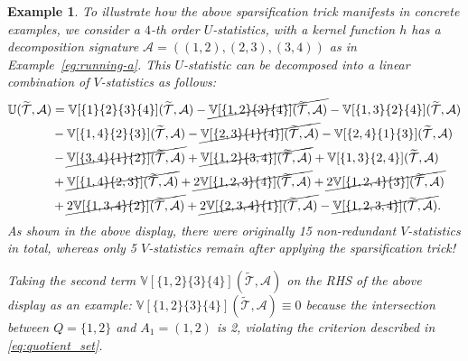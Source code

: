 \documentclass[twoside,11pt]{article}
\newtheorem{subexample}{Example}
\newcommand{\ustat}{\mathbb{U}}
\newcommand{\vstat}{\mathbb{V}}
\def\calA{\mathcal{A}}
\def\calT{\mathcal{T}}
\begin{document}
\begin{subexample}
\label{eg:sparsification}
To illustrate how the above sparsification trick manifests in concrete examples, we consider a $4$-th order $U$-statistics, with a kernel function $h$ has a decomposition signature $\calA = ((1,2),(2,3),(3,4))$ as in Example~\ref{eg:running-a}. This $U$-statistic can be decomposed into a linear combination of $V$-statistics as follows:
\begin{align*}
  \ustat(\widetilde{ \calT }, \calA) &= \vstat[\{1\}\{2\}\{3\}\{4\}](\widetilde{ \calT }, \calA) - \cancel{\vstat[\{1,2\}\{3\}\{4\}](\widetilde{ \calT }, \calA)}
- \vstat[\{1,3\}\{2\}\{4\}](\widetilde{ \calT }, \calA) \\
& - \vstat[\{1,4\}\{2\}\{3\}](\widetilde{ \calT }, \calA) - \cancel{\vstat[\{2,3\}\{1\}\{4\}](\widetilde{ \calT }, \calA)}
- \vstat[\{2,4\}\{1\}\{3\}](\widetilde{ \calT }, \calA)
 \\
& 
- \cancel{\vstat[\{3,4\}\{1\}\{2\}](\widetilde{ \calT }, \calA)}
+ \cancel{\vstat[\{1,2\}\{3,4\}](\widetilde{ \calT }, \calA)}
+ \vstat[\{1,3\}\{2,4\}](\widetilde{ \calT }, \calA)
 \\
& 
+ \cancel{\vstat[\{1,4\}\{2,3\}](\widetilde{ \calT }, \calA)}
+ \cancel{2\vstat[\{1,2,3\}\{4\}](\widetilde{ \calT }, \calA)}
+ \cancel{2\vstat[\{1,2,4\}\{3\}](\widetilde{ \calT }, \calA)} \\
& 
+ \cancel{2\vstat[\{1,3,4\}\{2\}](\widetilde{ \calT }, \calA)}
+ \cancel{2\vstat[\{2,3,4\}\{1\}](\widetilde{ \calT }, \calA)}
- \cancel{\vstat[\{1,2,3,4\}](\widetilde{ \calT }, \calA)}.
\end{align*}
As shown in the above display, there were originally 15 non-redundant $V$-statistics in total, whereas only 5 $V$-statistics remain after applying the sparsification trick! 

Taking the second term $\vstat[\{1,2\}\{3\}\{4\}](\widetilde{ \calT }, \calA)$ on the RHS of the above display as an example: $\vstat[\{1,2\}\{3\}\{4\}](\widetilde{ \calT }, \calA) \equiv 0$ because the intersection between $Q = \{1, 2\}$ and $A_1 = (1, 2)$ is 2, violating the criterion described in \eqref{eq:quotient_set}.
\end{subexample}

\end{document}
